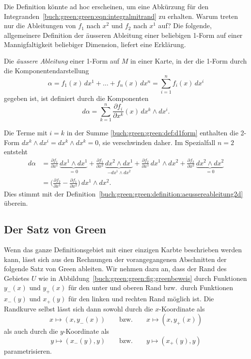Die Definition könnte ad hoc erscheinen, um eine Abkürzung für den
Integranden~\eqref{buch:green:green:eqn:integralmitrand} zu erhalten.
Warum treten nur die Ableitungen von $f_1$ nach $x^2$ und
$f_2$ nach $x^1$ auf?
Die folgende, allgemeinere Definition der äusseren Ableitung 
einer beliebigen 1-Form auf einer Mannigfaltigkeit beliebiger 
Dimension, liefert eine Erklärung.

\begin{definition}
Die {\em äussere Ableitung} einer 1-Form auf $M$
in einer Karte, in der die 1-Form durch die Komponentendarstellung
\[
\alpha
=
f_1(x)\,dx^1 + \dots + f_n(x)\, dx^n
=
\sum_{i=1}^n f_i(x)\,dx^i
\]
gegeben ist, ist
definiert durch die Komponenten
\begin{equation}
d\alpha
=
\sum_{k=1}^n
\frac{\partial f_i}{\partial x^k}(x)
\,dx^k\wedge dx^i.
\label{buch:green:green:def:d1form}
\end{equation}
\end{definition}

Die Terme mit $i=k$ in der Summe \eqref{buch:green:green:def:d1form}
enthalten die 2-Form $dx^k\wedge dx^i=dx^k\wedge dx^k=0$, sie
verschwinden daher.
Im Spezialfall $n=2$ entsteht
\begin{align*}
d\alpha
&=
\frac{\partial f_1}{\partial x^1}\,\underbrace{dx^1\wedge dx^1}_{\displaystyle=0}
+
\frac{\partial f_1}{\partial x^2}\,\underbrace{dx^2\wedge dx^1}_{\displaystyle-dx^1\wedge dx^2}
+
\frac{\partial f_2}{\partial x^1}\,dx^1\wedge dx^2
+
\frac{\partial f_2}{\partial x^2}\,\underbrace{dx^2\wedge dx^2}_{\displaystyle=0}
\\
&=
\biggl(
\frac{\partial f_2}{\partial x^1}
-
\frac{\partial f_1}{\partial x^2}
\biggr)
\,dx^1\wedge dx^2.
\end{align*}
Dies stimmt mit der
Definition~\ref{buch:green:green:definition:aeussereableitung2d}
überein.

%
%
\subsection{Der Satz von Green}
Wenn das ganze Definitionsgebiet mit einer einzigen Karbte beschrieben
werden kann, lässt sich aus den Rechnungen der vorangegangenen
Abschnitten der folgende Satz von Green ableiten.
%
Wir nehmen dazu an, dass der Rand des Gebietes $U$ wie in
Abbildung~\ref{buch:green:green:fig:greenbeweis}
durch Funktionen $y_-(x)$ und $y_+(x)$ für den unter und oberen Rand
bzw.~durch Funktionen $x_-(y)$ und $x_+(y)$ für den linken und rechten
Rand möglich ist.
Die Randkurve selbst lässt sich dann sowohl durch die $x$-Koordinate
als
\[
x\mapsto (x,y_-(x)) 
\qquad\text{bzw.}\qquad
x\mapsto (x,y_+(x)) 
\]
als auch durch die $y$-Koordinate als
\[
y\mapsto (x_-(y),y) 
\qquad\text{bzw.}\qquad
y\mapsto (x_+(y),y) 
\]
parametrisieren.
%

